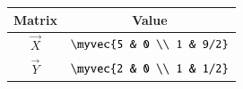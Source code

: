 \begin{tabular}[12pt]{ |c| c|}
    \hline
    \textbf{Matrix} & \textbf{Value}\\ 
    \hline
    $\vec{X}$ & $\myvec{5 & 0 \\ 1 & 9/2}$\\
    \hline
    $\vec{Y}$ & $\myvec{2 & 0 \\ 1 & 1/2}$\\
    \hline
\end{tabular}